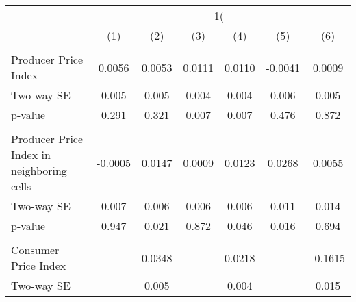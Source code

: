 {
\def\sym#1{\ifmmode^{#1}\else\(^{#1}\)\fi}
\begin{tabular}{l*{6}{c}}
\hline\hline
                    &&&\\\cmidrule(lr){2-3}\cmidrule(lr){4-5}\cmidrule(lr){6-7}
                    &         &         &         &         &         &         \\
\hline
\hline
\\ Producer Price Index&      0.0056         &      0.0053         &      0.0111         &      0.0110         &     -0.0041         &      0.0009         \\
\hspace{15pt} Two-way SE &       0.005         &       0.005         &       0.004         &       0.004         &       0.006         &       0.005         \\
\hspace{15pt} p-value&       0.291         &       0.321         &       0.007         &       0.007         &       0.476         &       0.872         \\
\\  Producer Price Index in neighboring cells&     -0.0005         &      0.0147         &      0.0009         &      0.0123         &      0.0268         &      0.0055         \\
\hspace{15pt} Two-way SE&       0.007         &       0.006         &       0.006         &       0.006         &       0.011         &       0.014         \\
\hspace{15pt} p-value&       0.947         &       0.021         &       0.872         &       0.046         &       0.016         &       0.694         \\
\\ Consumer Price Index&                     &      0.0348         &                     &      0.0218         &                     &     -0.1615         \\
\hspace{15pt} Two-way SE &                     &       0.005         &                     &       0.004         &                     &       0.015         \\

\end{tabular}}
